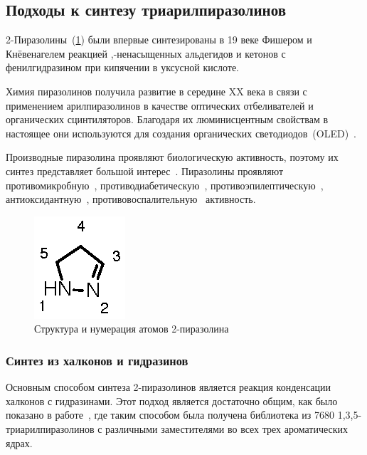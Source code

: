\subsection{Подходы к синтезу триарилпиразолинов}
2-Пиразолины~(\ref{fig:pyrazoline_structure}) были впервые синтезированы в 19 веке Фишером и Кнёвенагелем реакцией \chemalpha,\chembeta-ненасыщенных альдегидов и кетонов с фенилгидразином при кипячении в уксусной кислоте.

Химия пиразолинов получила развитие в середине XX века в связи с применением арилпиразолинов в качестве оптических отбеливателей и органических сцинтиляторов.
Благодаря их люминисцентным свойствам в настоящее они используются для создания органических светодиодов~(OLED)~\cite{Stakhira2012,Ramkumar2015,Vandana2016}.

Производные пиразолина проявляют биологическую активность, поэтому их синтез представляет большой интерес~\cite{Salian2018, Singh2018,Korablina2016}.
Пиразолины проявляют противомикробную~\cite{Hassan2013}, противодиабетическую~\cite{Ahn2004}, противоэпилептическую~\cite{GunizKucukguzel2000}, антиоксидантную~\cite{Jagadish2013}, противовоспалительную~\cite{Barsoum2006} активность.

\begin{figure}
    \centering
    \includegraphics{sections/literature/img/pyrazoline_structure.eps}
    \caption{Структура и нумерация атомов 2-пиразолина}
    \label{fig:pyrazoline_structure}
\end{figure}

\subsubsection{Синтез из халконов и гидразинов}

Основным способом синтеза 2-пиразолинов является реакция конденсации халконов с гидразинами. 
Этот подход является достаточно общим, как было показано в работе~\cite{Powers1998}, где таким способом была получена библиотека из \num{7680} 1,3,5-триарилпиразолинов с различными заместителями во всех трех ароматических ядрах.

